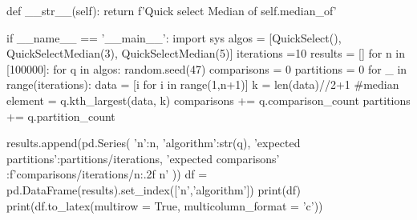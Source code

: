 \documentclass{homeworg}
\begin{document}
\begin{python}
    def __str__(self):
        return f'Quick select Median of {self.median_of}'

if __name__ == '__main__':
    import sys
    algos = [QuickSelect(), QuickSelectMedian(3), QuickSelectMedian(5)]
    iterations  =10
    results = []
    for n in [100000]:
        for q in algos:
            random.seed(47)
            comparisons = 0
            partitions = 0
            for _ in range(iterations):
                data = [i for i in range(1,n+1)]
                k = len(data)//2+1 #median
                element = q.kth_largest(data, k)
                comparisons += q.comparison_count
                partitions += q.partition_count
            
            results.append(pd.Series({
                'n':n,
                'algorithm':str(q),
                'expected partitions':partitions/iterations,
                'expected comparisons' :f'{comparisons/iterations/n:.2f} n'
            }))
    df = pd.DataFrame(results).set_index(['n','algorithm'])
    print(df)
    print(df.to_latex(multirow = True, multicolumn_format = 'c'))

\end{python}
\end{document}
